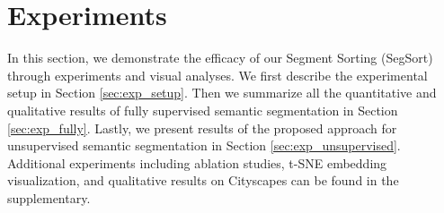 \documentclass[10pt,twocolumn,letterpaper]{article}
\begin{document}
 
\begin{table}[b]
  \centering
    \vspace{0.5pt}
    \caption{Quantitative results on Pascal VOC 2012. The first 4 rows with gray colored background are on validation set while the last 4 rows are on testing set. Networks trained with SegSort consistently outperform their parametric counterpart (Softmax) by 1.63 to 2.43\% in mIoU and by 4.07 to 7.97\% in boundary f-measure.}
    \label{tab:voc}
\end{table}


\section{Experiments}
\label{sec:exp}


In this section, we demonstrate the efficacy of our Segment Sorting (SegSort) through experiments and visual analyses. We first describe the experimental setup in Section \ref{sec:exp_setup}. Then we summarize all the quantitative and qualitative results of fully supervised semantic segmentation in Section \ref{sec:exp_fully}. Lastly, we present results of the proposed approach for unsupervised semantic segmentation in Section \ref{sec:exp_unsupervised}. Additional experiments including ablation studies, t-SNE embedding visualization, and qualitative results on Cityscapes can be found in the supplementary.
\end{document}
